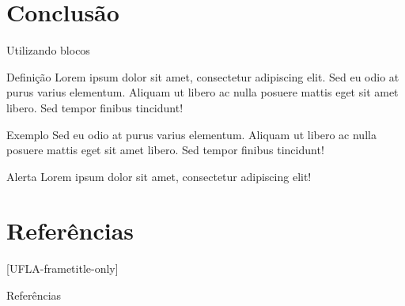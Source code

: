 \documentclass[17pt, c]{beamer}
\newif\ifabnt
\begin{document}
\section{Conclusão}
\insertsectionpage
\begin{frame}{Utilizando blocos}
	\begin{block}{Definição}
		Lorem ipsum dolor sit amet, consectetur adipiscing elit. Sed eu odio at purus varius elementum. Aliquam ut libero ac nulla posuere mattis eget sit amet libero. Sed tempor finibus tincidunt! \cite{UFLA2015}
	\end{block}
	\begin{exampleblock}{Exemplo}
		Sed eu odio at purus varius elementum. Aliquam ut libero ac nulla posuere mattis eget sit amet libero. Sed tempor finibus tincidunt!
	\end{exampleblock}
	\begin{alertblock}{Alerta}
		Lorem ipsum dolor sit amet, consectetur adipiscing elit! \cite{Franca2001} 
	\end{alertblock}
\end{frame}


\section{Referências}
[UFLA-frametitle-only]
\begin{frame}[t, allowframebreaks]{Referências}
	\ifabnt
		\citeoption{abnt-etal-text=it}%
		\citeoption{abnt-etal-cite=3}%
		\citeoption{abnt-missing-year=sd}%
		\citeoption{abnt-nbr10520=1988}%
		\vspace{-0.7cm}
	\else
		
	\fi
		
\end{frame}

\insertendpage
\end{document}
